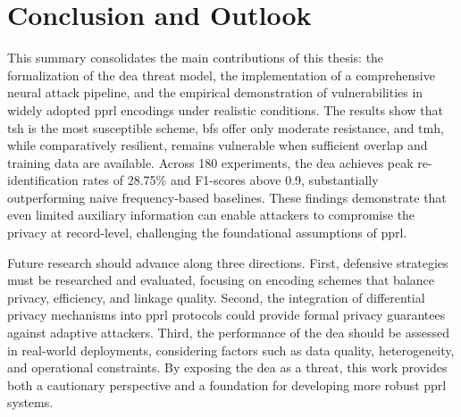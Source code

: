 \documentclass[a4paper,11pt]{scrartcl}
\begin{document}
\section{Conclusion and Outlook}

This summary consolidates the main contributions of this thesis: the formalization of the \ac{dea} threat model, the implementation of a comprehensive neural attack pipeline, and the empirical demonstration of vulnerabilities in widely adopted \ac{pprl} encodings under realistic conditions. 
The results show that \ac{tsh} is the most susceptible scheme, \ac{bf}s offer only moderate resistance, and \ac{tmh}, while comparatively resilient, remains vulnerable when sufficient overlap and training data are available. 
Across 180 experiments, the \ac{dea} achieves peak re-identification rates of 28.75\% and F1-scores above 0.9, substantially outperforming naive frequency-based baselines. 
These findings demonstrate that even limited auxiliary information can enable attackers to compromise the privacy at record-level, challenging the foundational assumptions of \ac{pprl}.

Future research should advance along three directions. 
First, defensive strategies must be researched and evaluated, focusing on encoding schemes that balance privacy, efficiency, and linkage quality.
Second, the integration of differential privacy mechanisms into \ac{pprl} protocols could provide formal privacy guarantees against adaptive attackers.
Third, the performance of the \ac{dea} should be assessed in real-world deployments, considering factors such as data quality, heterogeneity, and operational constraints.
By exposing the \ac{dea} as a threat, this work provides both a cautionary perspective and a foundation for developing more robust \ac{pprl} systems.
\end{document}
